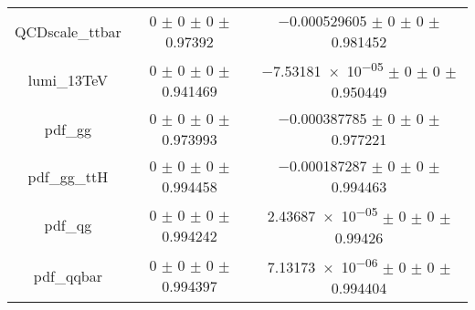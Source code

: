 \begin{table}
\begin{tabular}{ccc}
QCDscale\_ttbar & \num{0} $\pm$ \num{0} $\pm$ \num{0} $\pm$ \num{0.97392} & \num{-0.000529605} $\pm$ \num{0} $\pm$ \num{0} $\pm$ \num{0.981452}\\
lumi\_13TeV & \num{0} $\pm$ \num{0} $\pm$ \num{0} $\pm$ \num{0.941469} & \num{-7.53181e-05} $\pm$ \num{0} $\pm$ \num{0} $\pm$ \num{0.950449}\\
pdf\_gg & \num{0} $\pm$ \num{0} $\pm$ \num{0} $\pm$ \num{0.973993} & \num{-0.000387785} $\pm$ \num{0} $\pm$ \num{0} $\pm$ \num{0.977221}\\
pdf\_gg\_ttH & \num{0} $\pm$ \num{0} $\pm$ \num{0} $\pm$ \num{0.994458} & \num{-0.000187287} $\pm$ \num{0} $\pm$ \num{0} $\pm$ \num{0.994463}\\
pdf\_qg & \num{0} $\pm$ \num{0} $\pm$ \num{0} $\pm$ \num{0.994242} & \num{2.43687e-05} $\pm$ \num{0} $\pm$ \num{0} $\pm$ \num{0.99426}\\
pdf\_qqbar & \num{0} $\pm$ \num{0} $\pm$ \num{0} $\pm$ \num{0.994397} & \num{7.13173e-06} $\pm$ \num{0} $\pm$ \num{0} $\pm$ \num{0.994404}\\
\bottomrule
\end{tabular}
\end{table}